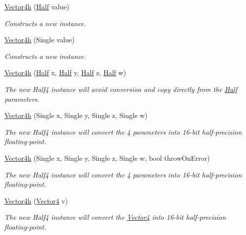\begin{DoxyCompactItemize}
\item 
\hyperlink{struct_open_t_k_1_1_vector4h_a760655a06249aa4fd9385fee08503ff5}{Vector4h} (\hyperlink{struct_open_t_k_1_1_half}{Half} value)
\begin{DoxyCompactList}\small\item\em Constructs a new instance. \end{DoxyCompactList}\item 
\hyperlink{struct_open_t_k_1_1_vector4h_a25ff21f92b28007f20b4c8b9ab8bab91}{Vector4h} (Single value)
\begin{DoxyCompactList}\small\item\em Constructs a new instance. \end{DoxyCompactList}\item 
\hyperlink{struct_open_t_k_1_1_vector4h_af7a3595b01553a74b45bf4ff39c35c9d}{Vector4h} (\hyperlink{struct_open_t_k_1_1_half}{Half} x, \hyperlink{struct_open_t_k_1_1_half}{Half} y, \hyperlink{struct_open_t_k_1_1_half}{Half} z, \hyperlink{struct_open_t_k_1_1_half}{Half} w)
\begin{DoxyCompactList}\small\item\em The new Half4 instance will avoid conversion and copy directly from the \hyperlink{struct_open_t_k_1_1_half}{Half} parameters. \end{DoxyCompactList}\item 
\hyperlink{struct_open_t_k_1_1_vector4h_a0c8855b2996c870e3a5f8a0aca743d2e}{Vector4h} (Single x, Single y, Single z, Single w)
\begin{DoxyCompactList}\small\item\em The new Half4 instance will convert the 4 parameters into 16-\/bit half-\/precision floating-\/point. \end{DoxyCompactList}\item 
\hyperlink{struct_open_t_k_1_1_vector4h_a1324ae70281515f6b74e74334a19f6d4}{Vector4h} (Single x, Single y, Single z, Single w, bool throw\-On\-Error)
\begin{DoxyCompactList}\small\item\em The new Half4 instance will convert the 4 parameters into 16-\/bit half-\/precision floating-\/point. \end{DoxyCompactList}\item 
\hyperlink{struct_open_t_k_1_1_vector4h_a55da9e440846113e9d6aac8b03503959}{Vector4h} (\hyperlink{struct_open_t_k_1_1_vector4}{Vector4} v)
\begin{DoxyCompactList}\small\item\em The new Half4 instance will convert the \hyperlink{struct_open_t_k_1_1_vector4}{Vector4} into 16-\/bit half-\/precision floating-\/point. \end{DoxyCompactList}\item 

\end{DoxyCompactItemize}
